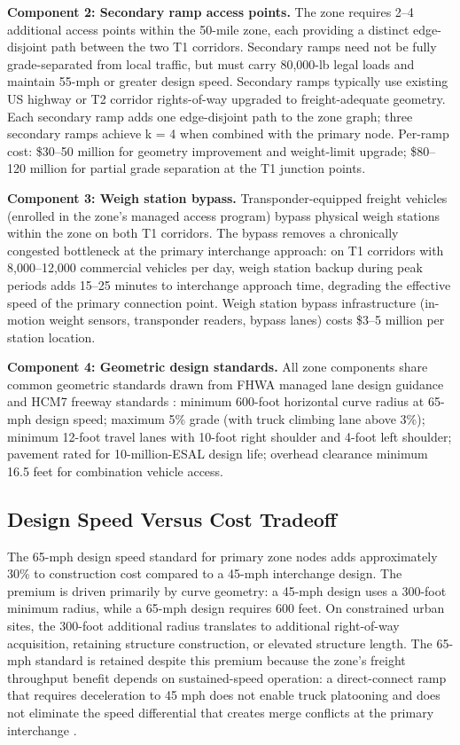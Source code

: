 \textbf{Component 2: Secondary ramp access points.} The zone requires 2--4 additional access points within the 50-mile zone, each providing a distinct edge-disjoint path between the two T1 corridors. Secondary ramps need not be fully grade-separated from local traffic, but must carry 80,000-lb legal loads and maintain 55-mph or greater design speed. Secondary ramps typically use existing US highway or T2 corridor rights-of-way upgraded to freight-adequate geometry. Each secondary ramp adds one edge-disjoint path to the zone graph; three secondary ramps achieve k = 4 when combined with the primary node. Per-ramp cost: \$30--50 million for geometry improvement and weight-limit upgrade; \$80--120 million for partial grade separation at the T1 junction points.

\textbf{Component 3: Weigh station bypass.} Transponder-equipped freight vehicles (enrolled in the zone's managed access program) bypass physical weigh stations within the zone on both T1 corridors. The bypass removes a chronically congested bottleneck at the primary interchange approach: on T1 corridors with 8,000--12,000 commercial vehicles per day, weigh station backup during peak periods adds 15--25 minutes to interchange approach time, degrading the effective speed of the primary connection point. Weigh station bypass infrastructure (in-motion weight sensors, transponder readers, bypass lanes) costs \$3--5 million per station location.

\textbf{Component 4: Geometric design standards.} All zone components share common geometric standards drawn from FHWA managed lane design guidance \citep{FHWA_ML2021} and HCM7 freeway standards \citep{HCM7}: minimum 600-foot horizontal curve radius at 65-mph design speed; maximum 5\% grade (with truck climbing lane above 3\%); minimum 12-foot travel lanes with 10-foot right shoulder and 4-foot left shoulder; pavement rated for 10-million-ESAL design life; overhead clearance minimum 16.5 feet for combination vehicle access.

\subsection{Design Speed Versus Cost Tradeoff}

The 65-mph design speed standard for primary zone nodes adds approximately 30\% to construction cost compared to a 45-mph interchange design. The premium is driven primarily by curve geometry: a 45-mph design uses a 300-foot minimum radius, while a 65-mph design requires 600 feet. On constrained urban sites, the 300-foot additional radius translates to additional right-of-way acquisition, retaining structure construction, or elevated structure length. The 65-mph standard is retained despite this premium because the zone's freight throughput benefit depends on sustained-speed operation: a direct-connect ramp that requires deceleration to 45 mph does not enable truck platooning and does not eliminate the speed differential that creates merge conflicts at the primary interchange \citep{Browand2004}.

